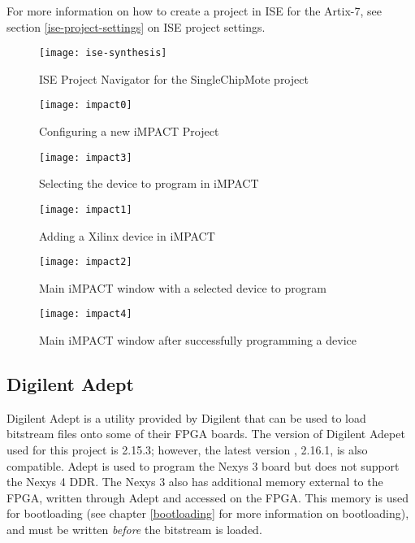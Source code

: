 For more information on how to create a project in ISE for the Artix-7, see section \ref{ise-project-settings} on ISE project settings.

\begin{figure}
\centering
\texttt{[image: ise-synthesis]}
\caption{ISE Project Navigator for the SingleChipMote project}
\label{fig:ise-synthesis}
\end{figure}

\begin{figure}
\centering
\texttt{[image: impact0]}
\caption{Configuring a new iMPACT Project}
\label{fig:impact0}
\end{figure}
\begin{figure}
\centering
\texttt{[image: impact3]}
\caption{Selecting the device to program in iMPACT}
\label{fig:impact3}
\end{figure}
\begin{figure}
\centering
\texttt{[image: impact1]}
\caption{Adding a Xilinx device in iMPACT}
\label{fig:impact1}
\end{figure}
\begin{figure}
\centering
\texttt{[image: impact2]}
\caption{Main iMPACT window with a selected device to program}
\label{fig:impact2}
\end{figure}
\begin{figure}
\centering
\texttt{[image: impact4]}
\caption{Main iMPACT window after successfully programming a device}
\label{fig:impact4}
\end{figure}

\subsection{Digilent Adept} \label{digilent-adept}
Digilent Adept is a utility provided by Digilent that can be used to load bitstream files onto some of their FPGA boards. The version of Digilent Adepet used for this project is 2.15.3; however, the latest version \cite{adept-download}, 2.16.1, is also compatible. Adept is used to program the Nexys 3 board but does not support the Nexys 4 DDR. The Nexys 3 also has additional memory external to the FPGA, written through Adept and accessed on the FPGA. This memory is used for bootloading (see chapter \ref{bootloading} for more information on bootloading), and must be written {\it before} the bitstream is loaded. \\


